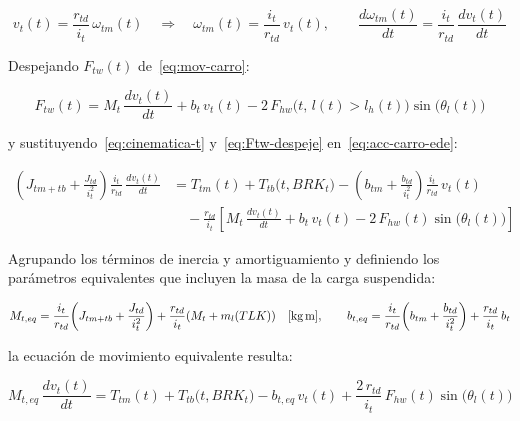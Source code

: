 \documentclass[12pt, a4paper]{article}
\begin{document}
\begin{equation}
    \label{eq:cinematica-t}
    v_t(t) = \frac{r_{td}}{i_t}\,\omega_{tm}(t)
    \quad\Rightarrow\quad
    \omega_{tm}(t) = \frac{i_t}{r_{td}}\,v_t(t),
    \qquad
    \frac{d\omega_{tm}(t)}{dt} = \frac{i_t}{r_{td}}\,\frac{dv_t(t)}{dt}
\end{equation}

Despejando $F_{tw}(t)$ de~\eqref{eq:mov-carro}:

\begin{equation}
    \label{eq:Ftw-despeje}
    F_{tw}(t) = M_t\,\frac{dv_t(t)}{dt} + b_t\,v_t(t)
               - 2\,F_{hw}\!\bigl(t,\,l(t)>l_h(t)\bigr)\sin\!\bigl(\theta_l(t)\bigr)
\end{equation}

y sustituyendo~\eqref{eq:cinematica-t} y~\eqref{eq:Ftw-despeje} en~\eqref{eq:acc-carro-ede}:

\begin{equation}
\begin{split}
    \left(J_{tm+tb}+\frac{J_{td}}{i_t^2}\right)\frac{i_t}{r_{td}}\,\frac{dv_t(t)}{dt}
    &= T_{tm}(t)+T_{tb}\!\bigl(t,BRK_t\bigr)
       -\left(b_{tm}+\frac{b_{td}}{i_t^2}\right)\frac{i_t}{r_{td}}\,v_t(t) \\[4pt]
    &\quad -\frac{r_{td}}{i_t}\!\left[M_t\,\frac{dv_t(t)}{dt}+b_t\,v_t(t)
           -2\,F_{hw}(t)\sin\!\bigl(\theta_l(t)\bigr)\right]
\end{split}
\end{equation}

Agrupando los términos de inercia y amortiguamiento y definiendo los parámetros
equivalentes que incluyen la masa de la carga suspendida:

\begin{equation}
    \label{eq:Mteq-bteq}
    M_{t,eq} = \frac{i_t}{r_{td}}\!\left(J_{tm+tb}+\frac{J_{td}}{i_t^2}\right)
               +\frac{r_{td}}{i_t}(M_t+m_l(TLK))
    \quad[\text{kg\,m}],
    \qquad
    b_{t,eq} = \frac{i_t}{r_{td}}\!\left(b_{tm}+\frac{b_{td}}{i_t^2}\right)
               +\frac{r_{td}}{i_t}\,b_t
\end{equation}

la ecuación de movimiento equivalente resulta:

\begin{equation}
    \label{eq:mov-equiv-t}
    M_{t,eq}\,\frac{dv_t(t)}{dt} = T_{tm}(t)+T_{tb}\!\bigl(t,BRK_t\bigr)
    - b_{t,eq}\,v_t(t)
    + \frac{2\,r_{td}}{i_t}\,F_{hw}(t)\sin\!\bigl(\theta_l(t)\bigr)
\end{equation}
\end{document}
